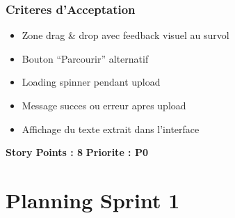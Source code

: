 ﻿\documentclass[12pt,a4paper]{report}
\begin{document}
\subsection*{Criteres d'Acceptation}
\begin{itemize}
    \item[\checkmark] Zone drag \& drop avec feedback visuel au survol
    \item[\checkmark] Bouton ``Parcourir'' alternatif
    \item[\checkmark] Loading spinner pendant upload
    \item[\checkmark] Message succes ou erreur apres upload
    \item[\checkmark] Affichage du texte extrait dans l'interface
\end{itemize}

\textbf{Story Points : 8} \hfill \textbf{Priorite : P0}

\chapter{Planning Sprint 1}
\end{document}
